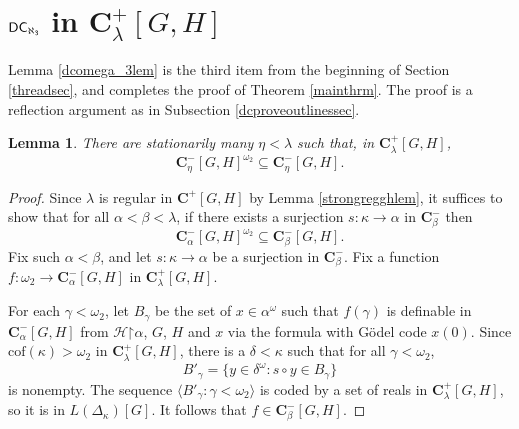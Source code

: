 \documentclass[12pt]{article}
\newtheorem{lemma}[theorem]{Lemma}
\def\bbC{{\mathbf{C}}}
\def\cH{{\mathcal{H}}}
\newcommand{\powerset}{\mathcal{P}}
\newcommand{\cf}{{\rm cf}}
\newcommand{\DC}{\mathsf{DC}}
\newcommand{\cof}{\mathrm{cof}}
\newcommand{\restrict}{\mathord{\upharpoonright}}
\begin{document}
\section{$\sf{DC}_{\aleph_3}$ in $\bbC^+_{\lambda}[G,H]$}\label{dc3sec}




Lemma \ref{dcomega_3lem} is the third item from the beginning of Section \ref{threadsec}, and completes the proof of Theorem \ref{mainthrm}.
The proof is a reflection argument as in Subsection \ref{dcproveoutlinessec}.

\begin{lemma}\label{omega2 closure}
There are stationarily many $\eta < \lambda$ such that, in $\bbC^+_{\lambda}[G, H]$,
\[\bbC^{-}_{\eta}[G, H]^{\omega_2}\subseteq \bbC^{-}_{\eta}[G, H].\]
\end{lemma}

\begin{proof}

Since $\lambda$ is regular in $\bbC^{+}[G, H]$ by Lemma \ref{strongregghlem}, it suffices to show that for all $\alpha < \beta < \lambda$, if there exists a surjection $s \colon \kappa \to \alpha$ in $\bbC^{-}_{\beta}$ then \[\bbC^{-}_{\alpha}[G, H]^{\omega_2}\subseteq \bbC^{-}_{\beta}[G, H].\]
Fix such $\alpha < \beta$, and let $s \colon \kappa \to \alpha$ be a surjection in $\bbC^{-}_{\beta}$.
Fix a function $f \colon \omega_{2} \to \bbC^{-}_{\alpha}[G, H]$ in $\bbC^{+}_{\lambda}[G,H]$.


For each $\gamma < \omega_{2}$, let $B_{\gamma}$ be the set of $x \in \alpha^{\omega}$ such that
$f(\gamma)$ is definable in $\bbC^{-}_{\alpha}[G, H]$ from $\cH \restrict \alpha$, $G$, $H$ and $x$ via the formula with G\"{o}del code $x(0)$.
Since $\cof(\kappa) > \omega_{2}$ in $\bbC^{+}_{\lambda}[G, H]$, there is a $\delta < \kappa$ such that for all $\gamma < \omega_{2}$, \[B'_{\gamma} = \{ y \in \delta^{\omega} : s \circ y \in B_{\gamma}\}\] is nonempty.
The sequence $\langle B'_{\gamma} : \gamma < \omega_{2} \rangle$ is coded by a set of reals in $\bbC^{+}_{\lambda}[G, H]$, so it is in $L(\Delta_{\kappa})[G]$. It follows that $f \in \bbC^{-}_{\beta}[G,H]$.
\end{proof}
\end{document}
